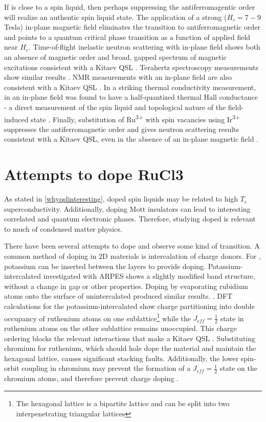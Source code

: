 If \rucl is close to a spin liquid, then perhaps suppressing the antiferromagentic order will realize an authentic spin liquid state. 	The application of a strong ($H_{c} = 7-9$ Tesla) in-plane magnetic field eliminates the transition to antiferromagnetic order and points to a quantum critical phase transition as a function of applied field near $H_{c}$. Time-of-flight inelastic neutron scattering with in-plane field shows both an absence of magnetic order and broad, gapped spectrum of magnetic excitations consistent with a Kitaev QSL \cite{Banerjee2017}. Terahertz spectroscopy measurements show similar results \cite{Wang2017}. NMR measurements with an in-plane field are also consistent with a Kitaev QSL \cite{Baek2017}. In a striking thermal conductivity measurement, \rucl in an in-plane field was found to have a half-quantized thermal Hall conductance - a direct measurement of the spin liquid and topological nature of the field-induced state \cite{Kasahara2018}. Finally, substitution of Ru\textsuperscript{3+} with spin vacancies using Ir\textsuperscript{3+} suppresses the antiferromagnetic order and gives neutron scattering results consistent with a Kitaev QSL, even in the absence of an in-plane magnetic field \cite{Lampen-Kelley2017}.

\section{Attempts to dope RuCl3}
As stated in \ref{whyqslinteresting}, doped spin liquids may be related to high $T_{c}$ superconductivity. Additionally, doping Mott insulators can lead to interesting correlated and quantum electronic phases. Therefore, studying doped \rucl is relevant to much of condensed matter physics.

There have been several attempts to dope \rucl and observe some kind of transition. A common method of doping in 2D materials is intercalation of charge donors. For \ruclnospace , potassium can be inserted between the layers to provide doping. Potassium-intercalated \rucl investigated with ARPES shows a slightly modified band structure, without a change in gap or other properties. Doping by evaporating rubidium atoms onto the surface of unintercalated \rucl produced similar results. \cite{Zhou2016}. DFT calculations for the potassium-intercalated \rucl show charge partitioning into double occupancy of ruthenium atoms on one sublattice\footnote{The hexagonal lattice is a bipartite lattice and can be split into two interpenetrating triangular lattices} while the $J_{eff} = \frac{1}{2}$ state in ruthenium atoms on the other sublattice remains unoccupied. This charge ordering blocks the relevant interactions that make \rucl a Kitaev QSL \cite{Koitzsch2017}. Substituting chromium for ruthenium, which should hole dope the material and maintain the hexagonal lattice, causes significant stacking faults. Additionally, the lower spin-orbit coupling in chromium may prevent the formation of a $J_{eff} = \frac{1}{2}$ state on the chromium atoms, and therefore prevent charge doping \cite{Roslova2019}.

